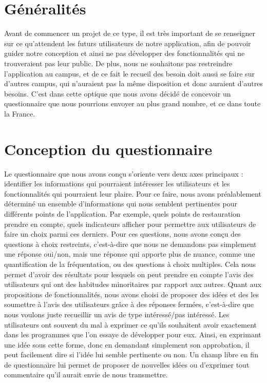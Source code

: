 
\section{Généralités}

Avant de commencer un projet de ce type, il est très important de se renseigner sur ce qu'attendent les futurs utilisateurs de notre application, afin de pouvoir guider notre conception et ainsi ne pas développer des fonctionnalités qui ne trouveraient pas leur public. De plus, nous ne souhaitons pas restreindre l'application au campus, et de ce fait le recueil des besoin doit aussi se faire sur d'autres campus, qui n'auraient pas la même disposition et donc auraient d'autres besoins. C’est dans cette optique que nous avons décidé de concevoir un questionnaire que nous pourrions envoyer au plus grand nombre, et ce dans toute la France.

\section{Conception du questionnaire}

Le questionnaire que nous avons conçu s'oriente vers deux axes principaux : identifier les informations qui pourraient intéresser les utilisateurs et les fonctionnalités qui pourraient leur plaire. \newline
Pour ce faire, nous avons préalablement déterminé un ensemble d'informations qui nous semblent pertinentes pour différents points de l'application. Par exemple, quels points de restauration prendre en compte, quels indicateurs afficher pour permettre aux utilisateurs de faire un choix parmi ces derniers. Pour ces questions, nous avons conçu des questions à choix restreints, c'est-à-dire que nous ne demandons pas simplement une réponse oui/non, mais une réponse qui apporte plus de nuance, comme une quantification de la fréquentation, ou des questions à choix multiples. Cela nous permet d'avoir des résultats pour lesquels on peut prendre en compte l'avis des utilisateurs qui ont des habitudes minoritaires par rapport aux autres. \newline
Quant aux propositions de fonctionnalités, nous avons choisi de proposer des idées et des les soumettre à l'avis des utilisateurs grâce à des réponses fermées, c'est-à-dire que nous voulons juste recueillir un avis de type intéressé/pas intéressé. Les utilisateurs ont souvent du mal à exprimer ce qu'ils souhaitent avoir exactement dans les programmes que l’on essaye de développer pour eux. Ainsi, en exprimant une idée sous cette forme, donc en demandant simplement son approbation, il peut facilement dire si l'idée lui semble pertinente ou non. Un champ libre en fin de questionnaire lui permet de proposer de nouvelles idées ou d'exprimer tout commentaire qu'il aurait envie de nous transmettre. \\

